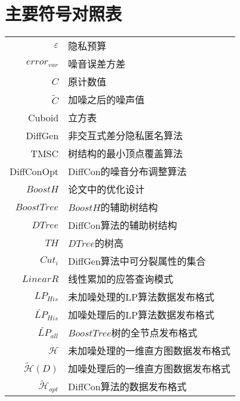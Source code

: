 \chapter{主要符号对照表}
\label{chap:symb}

\begin{longtable}{rl}
 $\varepsilon$     & 隐私预算 \\

 $error_{var}$  & 噪音误差方差 \\
 
 $C$            & 原计数值 \\
 $\tilde{C}$            & 加噪之后的噪声值 \\
 Cuboid         & 立方表 \\
 DiffGen            & 非交互式差分隐私匿名算法\supercite{DiffGen} \\
 TMSC	  & 树结构的最小顶点覆盖算法\\
 DiffConOpt			& DiffCon的噪音分布调整算法\\
 $BoostH$		& 论文\parencite{boosting}中的优化设计\\
 $BoostTree$			& $BoostH$的辅助树结构\\
 $DTree$		& DiffCon算法的辅助树结构\\
 $TH$		& $DTree$的树高\\
 $Cut_{i}$		& DiffGen算法中可分裂属性的集合\\
 
 $LinearR$ 		& 线性累加的应答查询模式 \\
 $LP_{His}$		& 未加噪处理的LP算法数据发布格式\\
 $\widetilde{LP}_{His}$			& 加噪处理后的LP算法数据发布格式\\
 $\widetilde{LP}_{all}$			& $BoostTree$树的全节点发布格式\\
 $\mathcal{H}$		& 未加噪处理的一维直方图数据发布格式\\
 $\tilde{\mathcal{H}}(D)$			& 加噪处理后的一维直方图数据发布格式\\
 $\tilde{\mathcal{H}}_{opt}$	& DiffCon算法的数据发布格式\\
\end{longtable}
